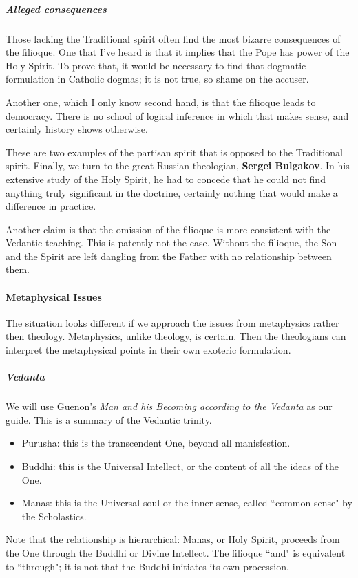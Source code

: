 \subparagraph{Alleged consequences}
Those lacking the Traditional spirit often find the most bizarre consequences of the filioque. One that I've heard is that it implies that the Pope has power of the Holy Spirit. To prove that, it would be necessary to find that dogmatic formulation in Catholic dogmas; it is not true, so shame on the accuser.

Another one, which I only know second hand, is that the filioque leads to democracy. There is no school of logical inference in which that makes sense, and certainly history shows otherwise.

These are two examples of the partisan spirit that is opposed to the Traditional spirit. Finally, we turn to the great Russian theologian, \textbf{Sergei Bulgakov}. In his extensive study of the Holy Spirit, he had to concede that he could not find anything truly significant in the doctrine, certainly nothing that would make a difference in practice.

Another claim is that the omission of the filioque is more consistent with the Vedantic teaching. This is patently not the case. Without the filioque, the Son and the Spirit are left dangling from the Father with no relationship between them.

\paragraph{Metaphysical Issues}
The situation looks different if we approach the issues from metaphysics rather then theology. Metaphysics, unlike theology, is certain. Then the theologians can interpret the metaphysical points in their own exoteric formulation.

\subparagraph{Vedanta}
We will use Guenon's \emph{Man and his Becoming according to the Vedanta} as our guide. This is a summary of the Vedantic trinity.

\begin{itemize}
\item Purusha: this is the transcendent One, beyond all manisfestion. 
\item Buddhi: this is the Universal Intellect, or the content of all the ideas of the One. 
\item Manas: this is the Universal soul or the inner sense, called ``common sense" by the Scholastics. 
\end{itemize}
Note that the relationship is hierarchical: Manas, or Holy Spirit, proceeds from the One through the Buddhi or Divine Intellect. The filioque ``and" is equivalent to ``through"; it is not that the Buddhi initiates its own procession.

